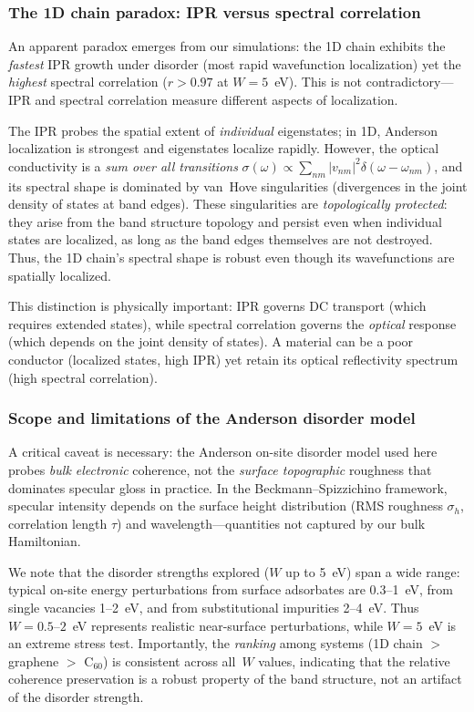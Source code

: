 \documentclass[twocolumn,showpacs,preprintnumbers,amsmath,amssymb,prb]{revtex4-2}
\begin{document}
\subsubsection{The 1D chain paradox: IPR versus spectral correlation}

An apparent paradox emerges from our simulations: the 1D chain
exhibits the \emph{fastest} IPR growth under disorder (most rapid
wavefunction localization) yet the \emph{highest} spectral correlation
($r > 0.97$ at $W = 5$~eV). This is not contradictory---IPR and
spectral correlation measure different aspects of localization.

The IPR probes the spatial extent of \emph{individual} eigenstates;
in 1D, Anderson localization is strongest and eigenstates localize
rapidly. However, the optical conductivity is a \emph{sum over all
transitions} $\sigma(\omega) \propto \sum_{nm} |v_{nm}|^2
\delta(\omega - \omega_{nm})$, and its spectral shape is dominated by
van~Hove singularities (divergences in the joint density of states at
band edges). These singularities are \emph{topologically protected}:
they arise from the band structure topology and persist even when
individual states are localized, as long as the band edges
themselves are not destroyed. Thus, the 1D chain's spectral shape is
robust even though its wavefunctions are spatially localized.

This distinction is physically important: IPR governs DC transport
(which requires extended states), while spectral correlation governs
the \emph{optical} response (which depends on the joint density of
states). A material can be a poor conductor (localized states,
high IPR) yet retain its optical reflectivity spectrum (high spectral
correlation).

\subsubsection{Scope and limitations of the Anderson disorder model}

A critical caveat is necessary: the Anderson on-site disorder model
used here probes \emph{bulk electronic} coherence, not the
\emph{surface topographic} roughness that dominates specular gloss
in practice. In the Beckmann--Spizzichino framework, specular
intensity depends on the surface height distribution (RMS roughness
$\sigma_h$, correlation length $\tau$) and wavelength---quantities
not captured by our bulk Hamiltonian.

We note that the disorder strengths explored ($W$ up to 5~eV) span a
wide range: typical on-site energy perturbations from surface
adsorbates are 0.3--1~eV, from single vacancies 1--2~eV, and from
substitutional impurities 2--4~eV. Thus $W = 0.5$--$2$~eV represents
realistic near-surface perturbations, while $W = 5$~eV is an extreme
stress test. Importantly, the \emph{ranking} among systems (1D chain
$>$ graphene $>$ C$_{60}$) is consistent across all~$W$ values,
indicating that the relative coherence preservation is a robust
property of the band structure, not an artifact of the disorder
strength.
\end{document}
